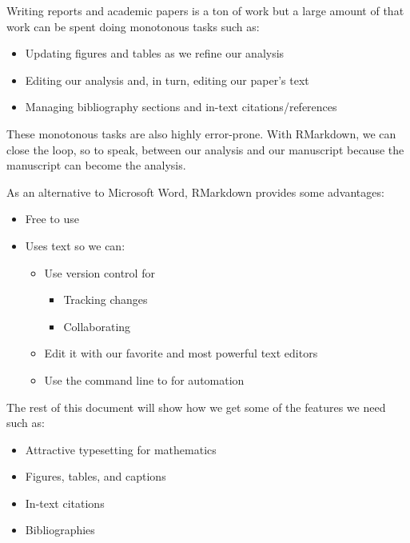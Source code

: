 \documentclass[
]{article}
\providecommand{\tightlist}{%
  \setlength{\itemsep}{0pt}\setlength{\parskip}{0pt}}
\begin{document}
Writing reports and academic papers is a ton of work but a large amount
of that work can be spent doing monotonous tasks such as:

\begin{itemize}
\tightlist
\item
  Updating figures and tables as we refine our analysis
\item
  Editing our analysis and, in turn, editing our paper's text
\item
  Managing bibliography sections and in-text citations/references
\end{itemize}

These monotonous tasks are also highly error-prone. With RMarkdown, we
can close the loop, so to speak, between our analysis and our manuscript
because the manuscript can become the analysis.

As an alternative to Microsoft Word, RMarkdown provides some advantages:

\begin{itemize}
\tightlist
\item
  Free to use
\item
  Uses text so we can:

  \begin{itemize}
  \tightlist
  \item
    Use version control for

    \begin{itemize}
    \tightlist
    \item
      Tracking changes
    \item
      Collaborating
    \end{itemize}
  \item
    Edit it with our favorite and most powerful text editors
  \item
    Use the command line to for automation
  \end{itemize}
\end{itemize}

The rest of this document will show how we get some of the features we
need such as:

\begin{itemize}
\tightlist
\item
  Attractive typesetting for mathematics
\item
  Figures, tables, and captions
\item
  In-text citations
\item
  Bibliographies
\end{itemize}
\end{document}
